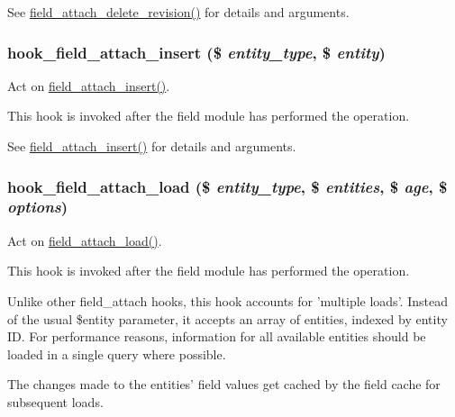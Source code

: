 See \hyperlink{group__field__attach_gaa9eae65e6d9f1996cb27a55ba25b56e9}{field\_\-attach\_\-delete\_\-revision()} for details and arguments. \hypertarget{group__field__attach_ga1a964f8aff654dca906c8784ba367115}{
\subsubsection[{hook\_\-field\_\-attach\_\-insert}]{\setlength{\rightskip}{0pt plus 5cm}hook\_\-field\_\-attach\_\-insert (\$ {\em entity\_\-type}, \/  \$ {\em entity})}}
\label{group__field__attach_ga1a964f8aff654dca906c8784ba367115}
Act on \hyperlink{group__field__attach_gad7c37d577b97db5e0c182bc570ed7cf4}{field\_\-attach\_\-insert()}.

This hook is invoked after the field module has performed the operation.

See \hyperlink{group__field__attach_gad7c37d577b97db5e0c182bc570ed7cf4}{field\_\-attach\_\-insert()} for details and arguments. \hypertarget{group__field__attach_gaf684402532a3eaebecc456c751142903}{
\subsubsection[{hook\_\-field\_\-attach\_\-load}]{\setlength{\rightskip}{0pt plus 5cm}hook\_\-field\_\-attach\_\-load (\$ {\em entity\_\-type}, \/  \$ {\em entities}, \/  \$ {\em age}, \/  \$ {\em options})}}
\label{group__field__attach_gaf684402532a3eaebecc456c751142903}
Act on \hyperlink{group__field__attach_ga1e92543395961c912eb293b50e991586}{field\_\-attach\_\-load()}.

This hook is invoked after the field module has performed the operation.

Unlike other field\_\-attach hooks, this hook accounts for 'multiple loads'. Instead of the usual \$entity parameter, it accepts an array of entities, indexed by entity ID. For performance reasons, information for all available entities should be loaded in a single query where possible.

The changes made to the entities' field values get cached by the field cache for subsequent loads.

